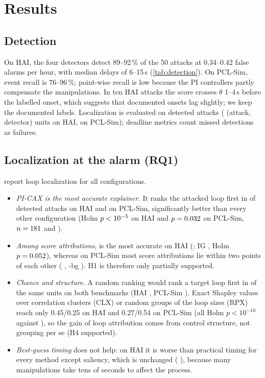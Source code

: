 \section{Results}\label{sec:results}

\subsection{Detection}
On HAI, the four detectors detect 89--92\,\% of the 50 attacks at 0.34--0.42 false alarms per hour, with median delays of 6--15\,s (\cref{tab:detection}). On PCL-Sim, event recall is 76--96\,\%; point-wise recall is low because the PI controllers partly compensate the manipulations. In ten HAI attacks the score crosses $\theta$ 1--4\,s before the labelled onset, which suggests that documented onsets lag slightly; we keep the documented labels. Localization is evaluated on detected attacks (\nhaitesthrOnealarmZero{} (attack, detector) units on HAI, \nsimtesthrOnealarmZero{} on PCL-Sim); deadline metrics count missed detections as failures.



\subsection{Localization at the alarm (RQ1)}
 report loop localization for all configurations.
\begin{itemize}
\item \emph{PI-CAX is the most accurate explainer.} It ranks the attacked loop first in \lochaiPICAXalarmZerosinglehrOne{} of detected attacks on HAI and \locsimPICAXalarmZerosinglehrOne{} on PCL-Sim, significantly better than every other configuration (Holm $p<10^{-5}$ on HAI and $p=0.032$ on PCL-Sim, $n=181$ and \pctestsimalarmn).
\item \emph{Among score attributions,} \LX{} is the most accurate on HAI (\lochaiLXalarmZerosinglehrOne; IG \lochaiIGalarmZerosinglehrOne, Holm $p=0.052$), whereas on PCL-Sim most score attributions lie within two points of each other (\LX{} \locsimLXalarmZerosinglehrOne, \LX-bg \locsimLXbgalarmZerosinglehrOne). H1 is therefore only partially supported.
\item \emph{Chance and structure.} A random ranking would rank a target loop first in \chancehaihrOne{} of the same units on both benchmarks (HAI \chancehaihrOne, PCL-Sim \chancesimhrOne). Exact Shapley values over correlation clusters (CLX) or random groups of the loop sizes (RPX) reach only 0.45/0.25 on HAI and 0.27/0.54 on PCL-Sim (all Holm $p<10^{-10}$ against \LX), so the gain of loop attribution comes from control structure, not grouping per se (H4 supported).
\item \emph{Best-guess timing} \citep{fung2024attributions} does not help: on HAI it is worse than practical timing for every method except saliency, which is unchanged (\LX{} \lochaiLXbestguesssinglehrOne), because many manipulations take tens of seconds to affect the process.
\end{itemize}

